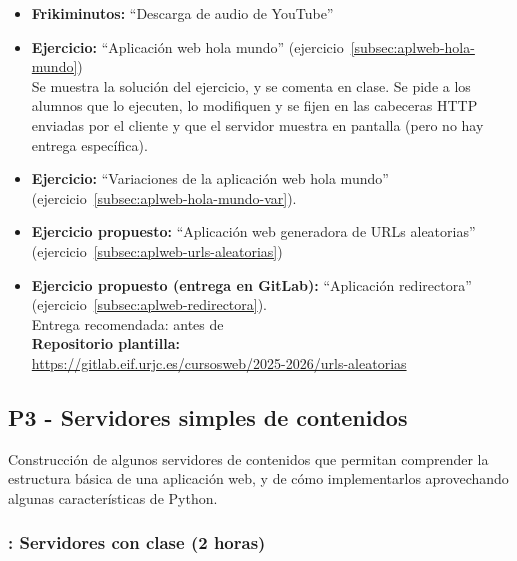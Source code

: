 \documentclass[a4paper,12pt]{article}
\begin{document}
\begin{itemize}
  \item \textbf{Frikiminutos:} ``Descarga de audio de YouTube''
  \item \textbf{Ejercicio:} ``Aplicación web hola mundo'' (ejercicio~\ref{subsec:aplweb-hola-mundo}) \\
     Se muestra la solución del ejercicio, y se comenta en clase. Se pide a los alumnos que lo ejecuten, lo modifiquen y se fijen en las cabeceras HTTP enviadas por el cliente y que el servidor muestra en pantalla (pero no hay entrega específica).
  \item \textbf{Ejercicio:} ``Variaciones de la aplicación web hola mundo'' (ejercicio~\ref{subsec:aplweb-hola-mundo-var}).
  \item \textbf{Ejercicio propuesto:} ``Aplicación web generadora de URLs aleatorias'' (ejercicio~\ref{subsec:aplweb-urls-aleatorias})
  \item \textbf{Ejercicio propuesto (entrega en GitLab):} ``Aplicación redirectora'' (ejercicio~\ref{subsec:aplweb-redirectora}). \\
     Entrega recomendada: antes de \juevesE \\
     \textbf{Repositorio plantilla:} \\
     \url{https://gitlab.eif.urjc.es/cursosweb/2025-2026/urls-aleatorias}
\end{itemize}

\subsection{P3 - Servidores simples de contenidos}

Construcción de algunos servidores de contenidos que permitan comprender la estructura básica de una aplicación web, y de cómo implementarlos aprovechando algunas características de Python.

\subsubsection{\juevesE: Servidores con clase (2 horas)}
\label{cal:juevesE}
\end{document}
